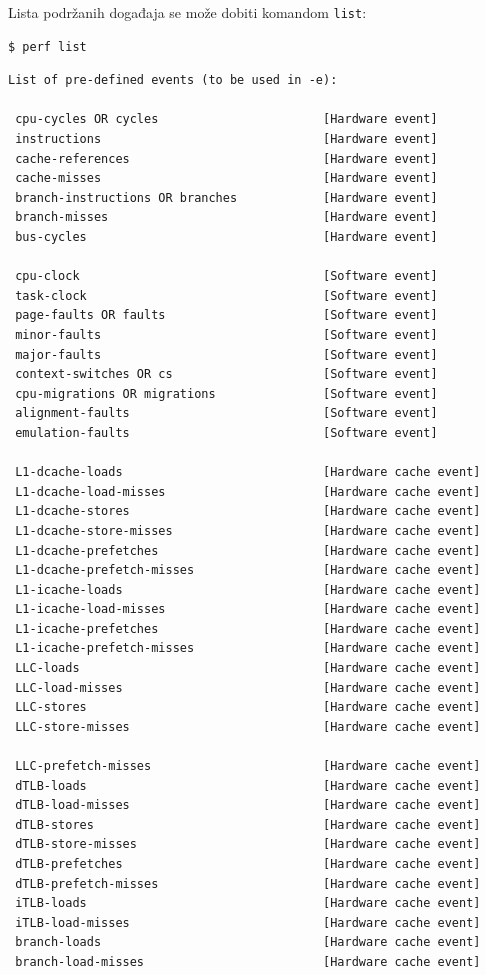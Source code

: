 Lista podržanih događaja se može dobiti komandom \texttt{list}:

\begin{verbatim}
$ perf list
\end{verbatim}

\begin{verbatim}
List of pre-defined events (to be used in -e):

 cpu-cycles OR cycles                       [Hardware event]
 instructions                               [Hardware event]
 cache-references                           [Hardware event]
 cache-misses                               [Hardware event]
 branch-instructions OR branches            [Hardware event]
 branch-misses                              [Hardware event]
 bus-cycles                                 [Hardware event]

 cpu-clock                                  [Software event]
 task-clock                                 [Software event]
 page-faults OR faults                      [Software event]
 minor-faults                               [Software event]
 major-faults                               [Software event]
 context-switches OR cs                     [Software event]
 cpu-migrations OR migrations               [Software event]
 alignment-faults                           [Software event]
 emulation-faults                           [Software event]

 L1-dcache-loads                            [Hardware cache event]
 L1-dcache-load-misses                      [Hardware cache event]
 L1-dcache-stores                           [Hardware cache event]
 L1-dcache-store-misses                     [Hardware cache event]
 L1-dcache-prefetches                       [Hardware cache event]
 L1-dcache-prefetch-misses                  [Hardware cache event]
 L1-icache-loads                            [Hardware cache event]
 L1-icache-load-misses                      [Hardware cache event]
 L1-icache-prefetches                       [Hardware cache event]
 L1-icache-prefetch-misses                  [Hardware cache event]
 LLC-loads                                  [Hardware cache event]
 LLC-load-misses                            [Hardware cache event]
 LLC-stores                                 [Hardware cache event]
 LLC-store-misses                           [Hardware cache event]

 LLC-prefetch-misses                        [Hardware cache event]
 dTLB-loads                                 [Hardware cache event]
 dTLB-load-misses                           [Hardware cache event]
 dTLB-stores                                [Hardware cache event]
 dTLB-store-misses                          [Hardware cache event]
 dTLB-prefetches                            [Hardware cache event]
 dTLB-prefetch-misses                       [Hardware cache event]
 iTLB-loads                                 [Hardware cache event]
 iTLB-load-misses                           [Hardware cache event]
 branch-loads                               [Hardware cache event]
 branch-load-misses                         [Hardware cache event]


\end{verbatim}
